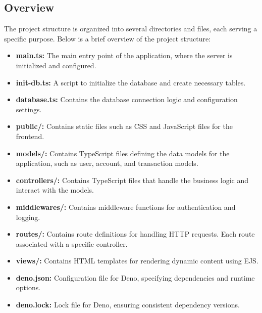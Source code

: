 \subsection{Overview}
The project structure is organized into several directories and files, each serving a
specific purpose. Below is a brief overview of the project structure:
\begin{itemize}
    \item \textbf{main.ts:} The main entry point of the application, where the server is
    initialized and configured.
    \item \textbf{init-db.ts:} A script to initialize the database and create necessary
    tables.
    \item \textbf{database.ts:} Contains the database connection logic and configuration
    settings.
    \item \textbf{public/:} Contains static files such as CSS and JavaScript files for the
    frontend.
    \item \textbf{models/:} Contains TypeScript files defining the data models for the
    application, such as user, account, and transaction models.
    \item \textbf{controllers/:} Contains TypeScript files that handle the business logic
    and interact with the models.
    \item \textbf{middlewares/:} Contains middleware functions for authentication and
    logging.
    \item \textbf{routes/:} Contains route definitions for handling HTTP
        requests. Each route associated with a specific controller.
    \item \textbf{views/:} Contains HTML templates for rendering dynamic content using EJS.
    \item \textbf{deno.json:} Configuration file for Deno, specifying dependencies and
    runtime options.
    \item \textbf{deno.lock:} Lock file for Deno, ensuring consistent dependency versions.
\end{itemize}

\vspace{3cm}

